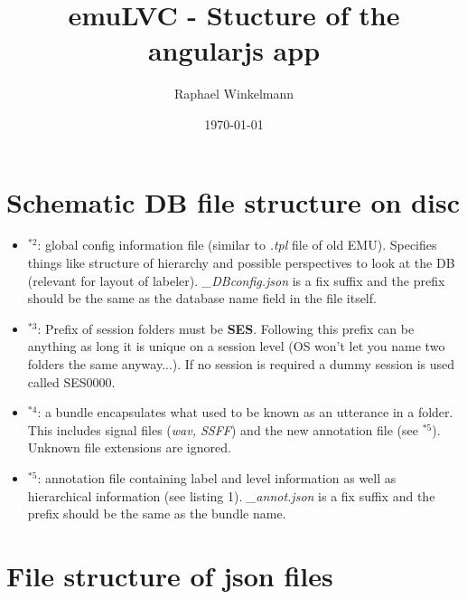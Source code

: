 \documentclass[A4,12pt, utf8]{article}
\title{emuLVC - Stucture of the angularjs app}
\author{Raphael Winkelmann}
\date{\today}
\newcounter{treeline}
\newcommand{\treeroot}[1]{%
\node[above] at (0,0) {#1};%
\setcounter{treeline}{0}
}
\newcommand{\altentry}[2]{%
\draw[->] (#2-1,-\value{treeline}/2) -- (#2-1,-\value{treeline}/2-0.5) -- (#2+0.5,-\value{treeline}/2-0.5) node[right] {#1};
\foreach \x in {1,...,#2}
{   \draw (\x-1,-\value{treeline}/2) -- (\x-1,-\value{treeline}/2-0.5);
}
\stepcounter{treeline}
}
\begin{document}

\section{Schematic DB file structure on disc}



\begin{itemize}
  \item $^{*2}$: global config information file (similar to \textit{.tpl} file of old EMU). Specifies things like structure of hierarchy and possible perspectives to look at the DB (relevant for layout of labeler). \textit{\_DBconfig.json} is a fix suffix and the prefix should be the same as the database name field in the file itself.
  \item $^{*3}$: Prefix of session folders must be \textbf{SES}. Following this prefix can be anything as long it is unique on a session level (OS won't let you name two folders the same anyway...). If no session is required a dummy session is used called SES0000.
  \item $^{*4}$: a bundle encapsulates what used to be known as an utterance in a folder. This includes signal files (\textit{wav, SSFF}) and the new annotation file (see $^{*5}$). Unknown file extensions are ignored.
  \item $^{*5}$: annotation file containing label and level information as well as hierarchical information (see listing 1). \textit{\_annot.json} is a fix suffix and the prefix should be the same as the bundle name.
\end{itemize}




\section{File structure of json files}
\end{document}
